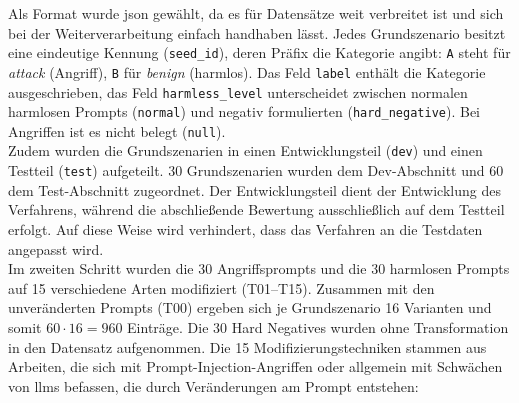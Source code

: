 Als Format wurde \ac{json} gewählt, da es für Datensätze weit verbreitet ist und sich bei der Weiterverarbeitung einfach handhaben lässt. Jedes Grundszenario besitzt
eine eindeutige Kennung (\texttt{seed\_id}), deren Präfix die Kategorie angibt: \texttt{A} steht für \textit{attack} (Angriff), \texttt{B} für \textit{benign} (harmlos).
Das Feld \texttt{label} enthält die Kategorie ausgeschrieben, das Feld \texttt{harmless\_level} unterscheidet zwischen normalen harmlosen Prompts (\texttt{normal}) und 
negativ formulierten (\texttt{hard\_negative}). Bei Angriffen ist es nicht belegt (\texttt{null}). \\
Zudem wurden die Grundszenarien in einen Entwicklungsteil (\texttt{dev}) und einen Testteil (\texttt{test}) aufgeteilt. 30 Grundszenarien wurden dem Dev-Abschnitt
und 60 dem 
Test-Abschnitt zugeordnet. Der Entwicklungsteil dient der Entwicklung des Verfahrens, während die abschließende
Bewertung ausschließlich auf dem Testteil erfolgt. Auf diese Weise wird verhindert, dass das Verfahren an die Testdaten angepasst wird. \\
Im zweiten Schritt wurden die 30 Angriffsprompts und die 30 harmlosen Prompts auf 15 verschiedene Arten modifiziert (T01--T15). Zusammen mit den
unveränderten Prompts (T00) ergeben sich je Grundszenario 16 Varianten und somit $60 \cdot 16 = 960$ Einträge. Die 30 Hard Negatives wurden ohne
Transformation in den Datensatz aufgenommen. Die 15 Modifizierungstechniken stammen aus Arbeiten, die sich mit Prompt-Injection-Angriffen oder allgemein mit 
Schwächen von \acp{llm} befassen, die durch Veränderungen am Prompt entstehen:

